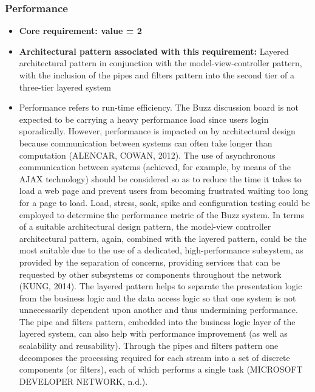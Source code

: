 \documentclass[a4paper]{article}
\begin{document}
\subsubsection{Performance}
\begin{itemize}
	\item \textbf{Core requirement: value = 2}
	\item \textbf{Architectural pattern associated with this requirement:} Layered architectural pattern in conjunction with the model-view-controller pattern, with the inclusion of the pipes and filters pattern into the second tier of a three-tier layered system
	\item Performance refers to run-time efficiency. The Buzz discussion board is not expected to be carrying a heavy performance load since users login sporadically. However, performance is impacted on by architectural design because communication between systems can often take longer than computation (ALENCAR, COWAN, 2012). The use of asynchronous communication between systems (achieved, for example, by means of the AJAX technology) should be considered so as to reduce the time it takes to load a web page and prevent users from becoming frustrated waiting too long for a page to load. Load, stress, soak, spike and configuration testing could be employed to determine the performance metric of the Buzz system. In terms of a suitable architectural design pattern, the model-view controller architectural pattern, again, combined with the layered pattern, could be the most suitable due to the use of a dedicated, high-performance subsystem, as provided by the separation of concerns, providing services that can be requested by other subsystems or components throughout the network (KUNG, 2014). The layered pattern helps to separate the presentation logic from the business logic and the data access logic so that one system is not unnecessarily dependent upon another and thus undermining performance. The pipe and filters pattern, embedded into the business logic layer of the layered system, can also help with performance improvement (as well as scalability and reusability). Through the pipes and filters pattern one decomposes the processing required for each stream into a set of discrete components (or filters), each of which performs a single task (MICROSOFT DEVELOPER NETWORK, n.d.). 
\end{itemize}
\end{document}
